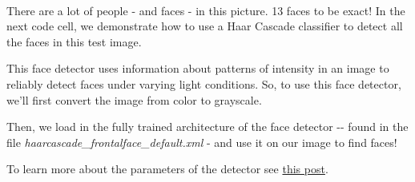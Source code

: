 \documentclass[11pt]{article}
\begin{document}
    \begin{center}
    \end{center}
    { \hspace*{\fill} \\}
    
    There are a lot of people - and faces - in this picture. 13 faces to be
exact! In the next code cell, we demonstrate how to use a Haar Cascade
classifier to detect all the faces in this test image.

This face detector uses information about patterns of intensity in an
image to reliably detect faces under varying light conditions. So, to
use this face detector, we'll first convert the image from color to
grayscale.

Then, we load in the fully trained architecture of the face detector
-\/- found in the file \emph{haarcascade\_frontalface\_default.xml} -
and use it on our image to find faces!

To learn more about the parameters of the detector see
\href{https://stackoverflow.com/questions/20801015/recommended-values-for-opencv-detectmultiscale-parameters}{this
post}.
\end{document}
